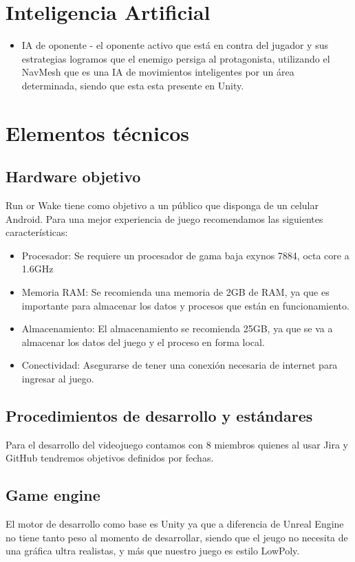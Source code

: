 \section{Inteligencia Artificial}
\begin{itemize}
	\item IA de oponente - el oponente activo que está en contra del jugador y sus estrategias
	      logramos que el enemigo persiga al protagonista, utilizando el NavMesh que es una IA de
	      movimientos inteligentes por un área determinada, siendo que esta esta presente en Unity.
\end{itemize}

\section{Elementos técnicos}
\subsection{Hardware objetivo}
Run or Wake tiene como objetivo a un público que disponga de un celular Android. Para una mejor
experiencia de juego recomendamos las siguientes características:
\begin{itemize}
	\item Procesador: Se requiere un procesador de gama baja exynos 7884, octa core a 1.6GHz
	\item Memoria RAM: Se recomienda una memoria de 2GB de RAM, ya que es importante para almacenar
	      los datos y procesos que están en funcionamiento.
	\item Almacenamiento: El almacenamiento se recomienda 25GB, ya que se va a almacenar los datos
	      del juego y el proceso en forma local.
	\item Conectividad: Asegurarse de tener una conexión necesaria de internet para ingresar al juego.
\end{itemize}

\subsection{ Procedimientos de desarrollo y estándares}
Para el desarrollo del videojuego contamos con 8 miembros quienes al usar Jira y GitHub tendremos objetivos
definidos por fechas.

\subsection{Game engine}
El motor de desarrollo como base es Unity ya que a diferencia de Unreal Engine no tiene tanto
peso al momento de desarrollar, siendo que el jeugo no necesita de una gráfica ultra realistas,
y más que nuestro juego es estilo LowPoly.

